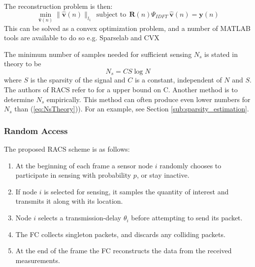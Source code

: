 \documentclass[Main]{subfiles}
\begin{document}
			The reconstruction problem is then:
			\begin{equation}
				\min_{\mathbf{\hat{v}}(n)} 
					\|\mathbf{\hat{v}}(n)\|_{l_1} 
					\ \ \text{subject to} \ \ 
					\mathbf{R}(n) \Psi_{IDFT}\ \mathbf{\hat{v}}(n) = \mathbf{y}(n)
					\label{eq:minimizationProblem}
			\end{equation}
			This can be solved as a convex optimization problem, and a number of MATLAB tools are available to do so e.g. Sparselab \cite{SparseLab:Online} and CVX \cite{CVX:Online}

			The minimum number of samples needed for sufficient sensing $N_s$ is stated in theory to be
			\begin{equation}
				N_s = CS \log{N}
				\label{eq:NsTheory} 
			\end{equation}
			where $S$ is the sparsity of the signal and $C$ is a constant, independent of $N$ and $S$.
			The authors of RACS refer to \cite{Candes2006} for a upper bound on C.
			Another method is to determine $N_s$ empirically.
			This method can often produce even lower numbers for $N_s$ than (\ref{eq:NsTheory})).
			For an example, see Section \ref{sub:sparsity_estimation}.
		


		\subsubsection{Random Access} %
		\label{sub:random_access}

			The proposed RACS scheme is as follows:

			\begin{enumerate}[label=\bfseries Step \arabic*:]
				\item 
					At the beginning of each frame a sensor node $i$ randomly chooses to participate in sensing with probability $p$, or stay inactive.
				\item 
					If node $i$ is selected for sensing, it samples the quantity of interest and transmits it along with its location.
				\item
					Node $i$ selects a transmission-delay $\theta_{i}$ before attempting to send its packet.
				\item
					The FC collects singleton packets, and discards any colliding packets.
				\item
					At the end of the frame the FC reconstructs  the data from the received measurements.

			\end{enumerate}
\end{document}
